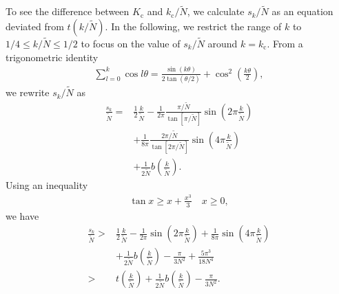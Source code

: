 To see the difference between $K_{\mathrm{c}}$ and $k_{\mathrm{c}}/\widetilde{N}$,
we calculate $s_{k}/\widetilde{N}$ as an equation deviated from $t(k/\widetilde{N})$. In the following, we restrict the range of $k$ to $1/4\leq k/\widetilde{N}\leq 1/2$ to focus on the value of $s_{k}/\widetilde{N}$ around $k=k_{\mathrm{c}}$. From a trigonometric identity
\begin{align}
    \sum_{l=0}^{k}\cos l\theta=\frac{\sin(k\theta)}{2\tan(\theta/2)}+\cos^{2}\left(\frac{k\theta}{2}\right),
\end{align}
we rewrite $s_{k}/\widetilde{N}$ as
\begin{align}
    \frac{s_{k}}{\widetilde{N}}=&\frac{1}{2}\frac{k}{\widetilde{N}}-\frac{1}{2\pi}\frac{\pi/\widetilde{N}}{\tan[\pi/\widetilde{N}]}\sin\left(2\pi\frac{k}{\widetilde{N}}\right)\\
    &+\frac{1}{8\pi}\frac{2\pi/\widetilde{N}}{\tan[2\pi/\widetilde{N}]}\sin\left(4\pi\frac{k}{\widetilde{N}}\right)\\
    &+\frac{1}{2\widetilde{N}}b\left(\frac{k}{\widetilde{N}}\right).
\end{align}
Using an inequality
\begin{align}
    \tan x \geq x + \frac{x^{3}}{3} \quad x\geq 0,
\end{align}
we have
\begin{align}
    \frac{s_{k}}{\widetilde{N}} > &\frac{1}{2}\frac{k}{\widetilde{N}}-\frac{1}{2\pi}\sin\left(2\pi\frac{k}{\widetilde{N}}\right)+\frac{1}{8\pi}\sin\left(4\pi\frac{k}{\widetilde{N}}\right)\\
    &+\frac{1}{2\widetilde{N}}b\left(\frac{k}{\widetilde{N}}\right)-\frac{\pi}{3N^{2}}+\frac{5\pi^{3}}{18 N^{4}}\\
    >& t\left(\frac{k}{\widetilde{N}}\right)+\frac{1}{2\widetilde{N}}b\left(\frac{k}{\widetilde{N}}\right)-\frac{\pi}{3N^{2}}.
\end{align}

